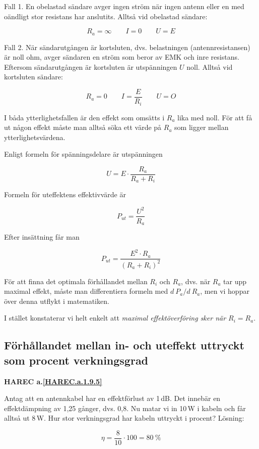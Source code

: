 Fall 1.
En obelastad sändare avger ingen ström när ingen antenn eller en med oändligt
stor resistans har anslutits.
Alltså vid obelastad sändare:

\[
	R_a = \infty \qquad I = 0 \qquad U = E
\]

Fall 2.
När sändarutgången är kortsluten, dvs. belastningen (antennresistansen) är
noll ohm, avger sändaren en ström som beror av EMK och inre resistans.
Eftersom sändarutgången är kortsluten är utspänningen \(U\) noll.
Alltså vid kortsluten sändare:

\[
	R_a = 0 \qquad I = \dfrac{E}{R_i} \qquad U = O
\]

I båda ytterlighetsfallen är den effekt som omsätts i \(R_a\) lika med noll.
För att få ut någon effekt måste man alltså söka ett värde på \(R_a\) som
ligger mellan ytterlighetsvärdena.

Enligt formeln för spänningsdelare är utspänningen

\[
	U = E \cdot \dfrac{R_a}{R_a+R_i}
\]

Formeln för uteffektens effektivvärde är

\[
	P_{ut} = \dfrac{U^2}{R_a}
\]

Efter insättning får man

\[
	P_{ut} = \dfrac{E^2 \cdot R_a}{(R_a + R_i)^2}
\]

För att finna det optimala förhållandet mellan \(R_i\) och \(R_a\), dvs. när
\(R_a\) tar upp maximal effekt, måste man differentiera formeln med \(d\ P_a/d\ R_a\), men vi hoppar över denna utflykt i matematiken.

I stället konstaterar vi helt enkelt att \emph{maximal effektöverföring sker när
\(R_i = R_a\)}. 

\subsection{Förhållandet mellan in- och uteffekt uttryckt som procent verkningsgrad}
\textbf{HAREC a.\ref{HAREC.a.1.9.5}\label{myHAREC.a.1.9.5}}

Antag att en antennkabel har en effektförlust av 1\,dB.
Det innebär en effektdämpning av 1,25 gånger, dvs. 0,8.
Nu matar vi in 10\,W i kabeln och får alltså ut 8\,W.
Hur stor verkningsgrad har kabeln uttryckt i procent?
Lösning:

\[
	\eta = \dfrac{8}{10} \cdot 100 = 80\ \%
\]
